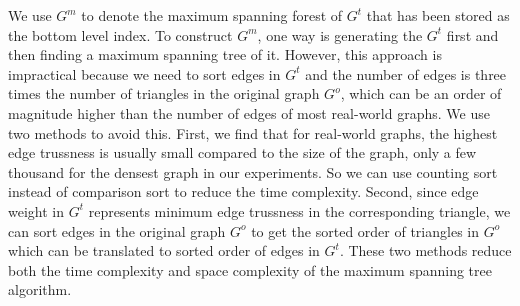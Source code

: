 We use $G^m$ to denote the maximum spanning forest of $G^t$ that has been stored as the bottom level index. To construct $G^m$, one way is generating the \inducedgraph{} $G^t$ first and then finding a maximum spanning tree of it. However, this approach is impractical because we need to sort edges in $G^t$ and the number of edges is three times the number of triangles in the original graph $G^o$, which can be an order of magnitude higher than the number of edges of most real-world graphs. We use two methods to avoid this. First, we find that for real-world graphs, the highest edge trussness is usually small compared to the size of the graph, \eg only a few thousand for the densest graph in our experiments. So we can use counting sort instead of comparison sort to reduce the time complexity. Second, since edge weight in $G^t$ represents minimum edge trussness in the corresponding triangle, we can sort edges in the original graph $G^o$ to get the sorted order of triangles in $G^o$ which can be translated to sorted order of edges in $G^t$. These two methods reduce both the time complexity and space complexity of the maximum spanning tree algorithm.


